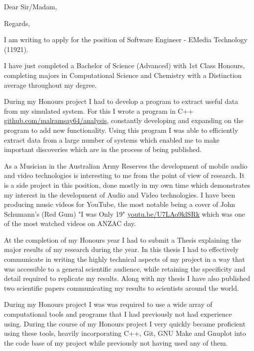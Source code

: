 


\recipient{~}{~}
\date{\today}
\opening{Dear Sir/Madam,}
\closing{Regards,}



\makelettertitle

I am writing to apply for the position of Software Engineer - EMedia Technology (11921). 


I have just completed a Bachelor of Science (Advanced) with 1st Class Honours, completing majors in Computational Science and Chemistry with a Distinction average throughout my degree.


During my Honours project I had to develop a program to extract useful data from my simulated system. For this I wrote a program in C++ \href{http://github.com/malramsay64/analysis}{github.com/malramsay64/analysis}, constantly developing and expanding on the program to add new functionality. Using this program I was able to efficiently extract data from a large number of systems which enabled me to make important discoveries which are in the process of being published.


As a Musician in the Australian Army Reserves the development of mobile audio and video technologies is interesting to me from the point of view of research. It is a side project in this position, done mostly in my own time which demonstrates my interest in the development of Audio and Video technologies. I have been producing music videos for YouTube, the most notable being a cover of John Schumann's (Red Gum) "I was Only 19" \href{https://youtu.be/U7LAo9klSRk}{youtu.be/U7LAo9klSRk} which was one of the most watched videos on ANZAC day.


At the completion of my Honours year I had to submit a Thesis explaining the major results of my research during the year. In this thesis I had to effectively communicate in writing the highly technical aspects of my project in a way that was accessible to a general scientific audience, while retaining the specificity and detail required to replicate my results. Along with my thesis I have also published two scientific papers communicating my results to scientists around the world.


During my Honours project I was was required to use a wide array of computational tools and programs that I had previously not had experience using. During the course of my Honours project I very quickly became proficient using these tools, heavily incorporating C++, Git, GNU Make and Gnuplot into the code base of my project while previously not having used any of them.


\makeletterclosing


